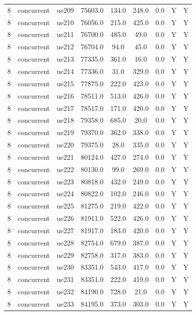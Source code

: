 \begin{table}[ht]
\begin{tabular}{|c|c|c|c|c|c|c|c|c|}
8 & concurrent & ue209 & 75603.0 & 134.0 & 248.0 & 0.0 & Y & Y \\
8 & concurrent & ue210 & 76056.0 & 215.0 & 425.0 & 0.0 & Y & Y \\
8 & concurrent & ue211 & 76700.0 & 485.0 & 49.0 & 0.0 & Y & Y \\
8 & concurrent & ue212 & 76704.0 & 94.0 & 45.0 & 0.0 & Y & Y \\
8 & concurrent & ue213 & 77335.0 & 361.0 & 16.0 & 0.0 & Y & Y \\
8 & concurrent & ue214 & 77336.0 & 31.0 & 329.0 & 0.0 & Y & Y \\
8 & concurrent & ue215 & 77875.0 & 222.0 & 423.0 & 0.0 & Y & Y \\
8 & concurrent & ue216 & 78511.0 & 513.0 & 426.0 & 0.0 & Y & Y \\
8 & concurrent & ue217 & 78517.0 & 171.0 & 420.0 & 0.0 & Y & Y \\
8 & concurrent & ue218 & 79358.0 & 685.0 & 20.0 & 0.0 & Y & Y \\
8 & concurrent & ue219 & 79370.0 & 362.0 & 338.0 & 0.0 & Y & Y \\
8 & concurrent & ue220 & 79375.0 & 28.0 & 335.0 & 0.0 & Y & Y \\
8 & concurrent & ue221 & 80124.0 & 427.0 & 274.0 & 0.0 & Y & Y \\
8 & concurrent & ue222 & 80130.0 & 99.0 & 269.0 & 0.0 & Y & Y \\
8 & concurrent & ue223 & 80818.0 & 432.0 & 249.0 & 0.0 & Y & Y \\
8 & concurrent & ue224 & 80822.0 & 102.0 & 246.0 & 0.0 & Y & Y \\
8 & concurrent & ue225 & 81275.0 & 219.0 & 422.0 & 0.0 & Y & Y \\
8 & concurrent & ue226 & 81911.0 & 522.0 & 426.0 & 0.0 & Y & Y \\
8 & concurrent & ue227 & 81917.0 & 183.0 & 420.0 & 0.0 & Y & Y \\
8 & concurrent & ue228 & 82754.0 & 679.0 & 387.0 & 0.0 & Y & Y \\
8 & concurrent & ue229 & 82758.0 & 317.0 & 383.0 & 0.0 & Y & Y \\
8 & concurrent & ue230 & 83351.0 & 543.0 & 417.0 & 0.0 & Y & Y \\
8 & concurrent & ue231 & 83351.0 & 222.0 & 419.0 & 0.0 & Y & Y \\
8 & concurrent & ue232 & 84190.0 & 728.0 & 21.0 & 0.0 & Y & Y \\
8 & concurrent & ue233 & 84195.0 & 373.0 & 303.0 & 0.0 & Y & Y \\

\end{tabular}
\end{table}
